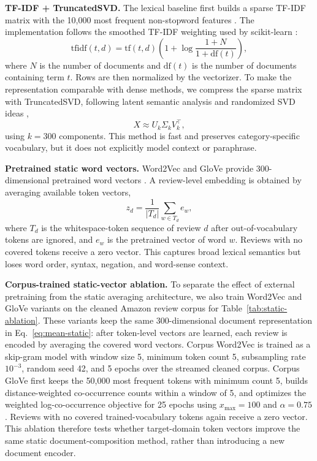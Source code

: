 \documentclass{article}
\begin{document}
\textbf{TF-IDF + TruncatedSVD.} The lexical baseline first builds a sparse TF-IDF matrix with the 10,000 most frequent non-stopword features \cite{salton1988}. The implementation follows the smoothed TF-IDF weighting used by scikit-learn \cite{pedregosa2011}:
\begin{equation}
\mathrm{tfidf}(t,d)=\mathrm{tf}(t,d)\left(1+\log \frac{1+N}{1+\mathrm{df}(t)}\right),
\end{equation}
where $N$ is the number of documents and $\mathrm{df}(t)$ is the number of documents containing term $t$. Rows are then normalized by the vectorizer. To make the representation comparable with dense methods, we compress the sparse matrix with TruncatedSVD, following latent semantic analysis and randomized SVD ideas \cite{deerwester1990,halko2011},
\begin{equation}
X \approx U_k \Sigma_k V_k^\top,
\end{equation}
using $k=300$ components. This method is fast and preserves category-specific vocabulary, but it does not explicitly model context or paraphrase.

\textbf{Pretrained static word vectors.} Word2Vec and GloVe provide 300-dimensional pretrained word vectors \cite{mikolov2013,pennington2014}. A review-level embedding is obtained by averaging available token vectors,
\begin{equation}
 z_d = \frac{1}{|T_d|}\sum_{w\in T_d} e_w,
\label{eq:mean-static}
\end{equation}
where $T_d$ is the whitespace-token sequence of review $d$ after out-of-vocabulary tokens are ignored, and $e_w$ is the pretrained vector of word $w$. Reviews with no covered tokens receive a zero vector. This captures broad lexical semantics but loses word order, syntax, negation, and word-sense context.

\textbf{Corpus-trained static-vector ablation.} To separate the effect of external pretraining from the static averaging architecture, we also train Word2Vec and GloVe variants on the cleaned Amazon review corpus for Table~\ref{tab:static-ablation}. These variants keep the same 300-dimensional document representation in Eq.~\eqref{eq:mean-static}: after token-level vectors are learned, each review is encoded by averaging the covered word vectors. Corpus Word2Vec is trained as a skip-gram model with window size 5, minimum token count 5, subsampling rate $10^{-3}$, random seed 42, and 5 epochs over the streamed cleaned corpus. Corpus GloVe first keeps the 50,000 most frequent tokens with minimum count 5, builds distance-weighted co-occurrence counts within a window of 5, and optimizes the weighted log-co-occurrence objective for 25 epochs using $x_{\max}=100$ and $\alpha=0.75$. Reviews with no covered trained-vocabulary tokens again receive a zero vector. This ablation therefore tests whether target-domain token vectors improve the same static document-composition method, rather than introducing a new document encoder.
\end{document}
